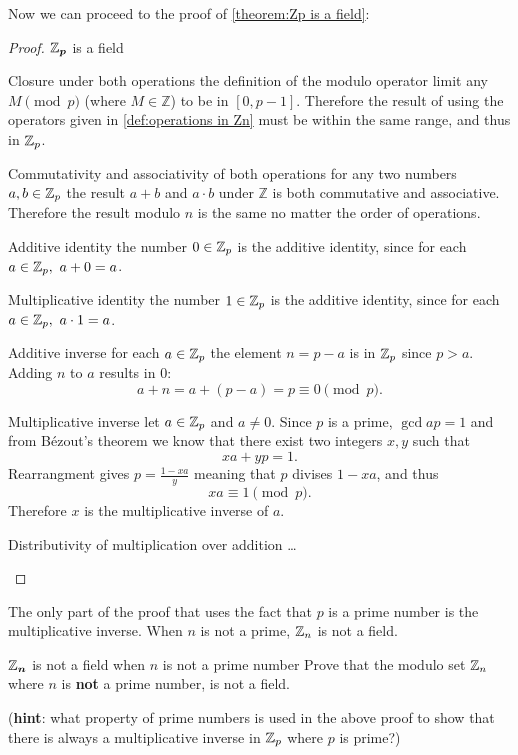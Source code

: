 Now we can proceed to the proof of \autoref{theorem:Zp is a field}:

\begin{proof}{$\bm{\mathbb{Z}_{p}}$ is a field}{}
	\begin{descitemize}
	\item[Closure under both operations] the definition of the modulo operator limit any $M\pmod{p}$ (where $M\in\mathbb{Z}$) to be in $[0,p-1]$. Therefore the result of using the operators given in \autoref{def:operations in Zn} must be within the same range, and thus in $\mathbb{Z}_{p}$.

	\item[Commutativity and associativity of both operations] for any two numbers $a,b\in\mathbb{Z}_{p}$ the result $a+b$ and $a\cdot b$ under $\mathbb{Z}$ is both commutative and associative. Therefore the result modulo $n$ is the same no matter the order of operations.

	\item[Additive identity] the number $0\in\mathbb{Z}_{p}$ is the additive identity, since for each $a\in\mathbb{Z}_{p},\ a+0=a$.
	
	\item[Multiplicative identity] the number $1\in\mathbb{Z}_{p}$ is the additive identity, since for each $a\in\mathbb{Z}_{p},\ a\cdot1=a$.

	\item[Additive inverse] for each $a\in\mathbb{Z}_{p}$ the element $n=p-a$ is in $\mathbb{Z}_{p}$ since $p>a$. Adding $n$ to $a$ results in $0$:
		\[
			a+n = a+(p-a) = p \equiv 0\pmod{p}.
		\]
	
	\item[Multiplicative inverse] let $a\in\mathbb{Z}_{p}$ and $a\neq0$. Since $p$ is a prime, $\gcd{a}{p}=1$ and from B\'ezout's theorem we know that there exist two integers $x,y$ such that
		\[
			xa + yp = 1.
		\]
		Rearrangment gives $p = \frac{1-xa}{y}$ meaning that $p$ divises $1-xa$, and thus
		\[
			xa\equiv1\pmod{p}.
		\]
		Therefore $x$ is the multiplicative inverse of $a$.
	
	\item[Distributivity of multiplication over addition] \ldots
	\end{descitemize}
\end{proof}

The only part of the proof that uses the fact that $p$ is a prime number is the multiplicative inverse. When $n$ is not a prime, $\mathbb{Z}_{n}$ is not a field.

\begin{challange}{$\bm{\mathbb{Z}_{n}}$ is not a field when $n$ is not a prime number}{}
	Prove that the modulo set $\mathbb{Z}_{n}$ where $n$ is \textbf{not} a prime number, is not a field.

	(\textbf{hint}: what property of prime numbers is used in the above proof to show that there is always a multiplicative inverse in $\mathbb{Z}_{p}$ where $p$ is prime?)
\end{challange}
